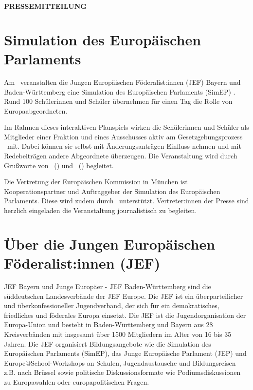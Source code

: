 \documentclass[11pt]{article}
\begin{document}
\thispagestyle{empty}

\begin{center}
    \textbf{\Large PRESSEMITTEILUNG}
\end{center}

\vspace{0.5cm}

\section*{Simulation des Europäischen Parlaments \location}

Am \datum\ veranstalten die Jungen Europäischen Föderalist:innen (JEF) Bayern und Baden-Württemberg eine Simulation des Europäischen Parlaments (SimEP) \location. Rund 100 Schülerinnen und Schüler übernehmen für einen Tag die Rolle von Europaabgeordneten.

Im Rahmen dieses interaktiven Planspiels wirken die Schülerinnen und Schüler als Mitglieder einer Fraktion und eines Ausschusses aktiv am Gesetzgebungsprozess \theme\ mit. Dabei können sie selbst mit Änderungsanträgen Einfluss nehmen und mit Redebeiträgen andere Abgeordnete überzeugen. Die Veranstaltung wird durch Grußworte von \stadtvertreter\ (\stadtvertreterOffice) und \politiker\ (\politikerOffice) begleitet.

Die Vertretung der Europäischen Kommission in München ist Kooperationspartner und Auftraggeber der Simulation des Europäischen Parlaments.
\iflocalSupportPresent Diese wird zudem durch \localSupport\ unterstützt.\fi
Vertreter:innen der Presse sind herzlich eingeladen die Veranstaltung journalistisch zu begleiten.

\section*{Über die Jungen Europäischen Föderalist:innen (JEF)}

JEF Bayern und Junge Europäer - JEF Baden-Württemberg sind die süddeutschen Landesverbände der JEF Europe. Die JEF ist ein überparteilicher und überkonfessioneller Jugendverband, der sich für ein demokratisches, friedliches und föderales Europa einsetzt. Die JEF ist die Jugendorganisation der Europa-Union und besteht in Baden-Württemberg und Bayern aus 28 Kreisverbänden mit insgesamt über 1500 Mitgliedern im Alter von 16 bis 35 Jahren. Die JEF organisiert Bildungsangebote wie die Simulation des Europäischen Parlaments (SimEP), das Junge Europäische Parlament (JEP) und Europe@School-Workshops an Schulen, Jugendaustausche und Bildungsreisen z.B. nach Brüssel sowie politische Diskussionsformate wie Podiumsdiskussionen zu Europawahlen oder europapolitischen Fragen.

\vfill

\PlaceLogosOne

\vspace{1cm}

\end{document}

